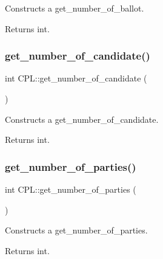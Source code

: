 Constructs a get\+\_\+number\+\_\+of\+\_\+ballot. 

\begin{DoxyReturn}{Returns}
int. 
\end{DoxyReturn}
\mbox{\label{classCPL_a52108f0b6bcaa0e5062d5ecb2dd2d534}} 
\subsubsection{\texorpdfstring{get\+\_\+number\+\_\+of\+\_\+candidate()}{get\_number\_of\_candidate()}}
{\footnotesize\ttfamily int C\+P\+L\+::get\+\_\+number\+\_\+of\+\_\+candidate (\begin{DoxyParamCaption}{ }\end{DoxyParamCaption})}



Constructs a get\+\_\+number\+\_\+of\+\_\+candidate. 

\begin{DoxyReturn}{Returns}
int. 
\end{DoxyReturn}
\mbox{\label{classCPL_a72780d6cddbb31cc03def8eb6a395c58}} 
\subsubsection{\texorpdfstring{get\+\_\+number\+\_\+of\+\_\+parties()}{get\_number\_of\_parties()}}
{\footnotesize\ttfamily int C\+P\+L\+::get\+\_\+number\+\_\+of\+\_\+parties (\begin{DoxyParamCaption}{ }\end{DoxyParamCaption})}



Constructs a get\+\_\+number\+\_\+of\+\_\+parties. 

\begin{DoxyReturn}{Returns}
int. 
\end{DoxyReturn}
\mbox{\label{classCPL_a1493855f5ec961e018e2c9c3bfe11c7f}} 
